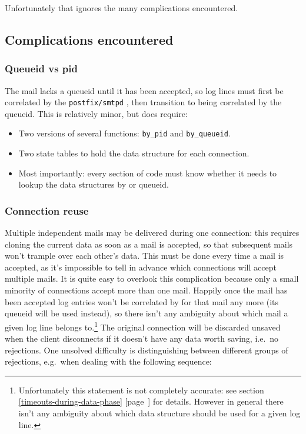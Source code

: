 \documentclass[a4paper,12pt,draft]{article}
\newcommand{\refwithpage}[1]{%
    \empty{}\ref{#1} [page~\pageref{#1}]%
}
\newcommand{\daemon}[1]{%
    \texttt{postfix/#1}%
}
\begin{document}
Unfortunately that ignores the many complications encountered.


\subsection{Complications encountered}

\label{complications}


\subsubsection{Queueid vs pid}

The mail lacks a queueid until it has been accepted, so log lines must
first be correlated by the \daemon{smtpd} \pid{}, then transition to being
correlated by the queueid.  This is relatively minor, but does require:

\begin{itemize}

    \item Two versions of several functions: \texttt{by\_pid} and
        \texttt{by\_queueid}.

    \item Two state tables to hold the data structure for each connection.

    \item Most importantly: every section of code must know whether it
        needs to lookup the data structures by \pid{} or queueid.

\end{itemize}

\subsubsection{Connection reuse}

\label{connection reuse}

Multiple independent mails may be delivered during one connection: this
requires cloning the current data as soon as a mail is accepted, so that
subsequent mails won't trample over each other's data.  This must be done
every time a mail is accepted, as it's impossible to tell in advance which
connections will accept multiple mails.  It is quite easy to overlook this
complication because only a small minority of connections accept more than
one mail. Happily once the mail has been accepted log entries won't be
correlated by \pid{} for that mail any more (its queueid will be used
instead), so there isn't any ambiguity about which mail a given log line
belongs to.\footnote{Unfortunately this statement is not completely
accurate: see section~\refwithpage{timeouts-during-data-phase} for details.
However in general there isn't any ambiguity about which data structure
should be used for a given log line.}  The original connection will be
discarded unsaved when the client disconnects if it doesn't have any data
worth saving, i.e.\ no rejections.  One unsolved difficulty is
distinguishing between different groups of rejections, e.g.\ when dealing
with the following sequence:
\end{document}
